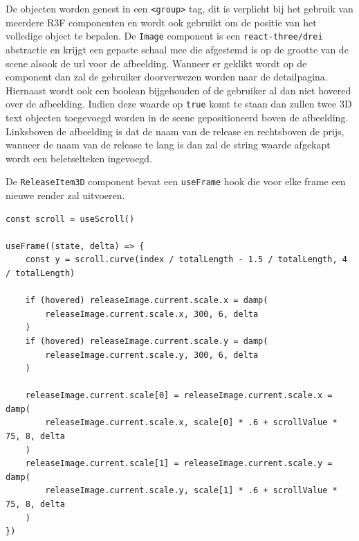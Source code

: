 De objecten worden genest in een \texttt{<group>} tag, dit is verplicht bij het gebruik van meerdere R3F componenten en wordt ook gebruikt om de positie van het volledige object te bepalen.
De \texttt{Image} component is een \texttt{react-three/drei} abstractie en krijgt een gepaste schaal mee die afgestemd is op de grootte van de scene alsook de url voor de afbeelding. Wanneer er geklikt wordt op de component dan zal de gebruiker doorverwezen worden naar de detailpagina. Hiernaast wordt ook een boolean bijgehouden of de gebruiker al dan niet hovered over de afbeelding. Indien deze waarde op \texttt{true} komt te staan dan zullen twee 3D text objecten toegevoegd worden in de scene gepositioneerd boven de afbeelding. Linksboven de afbeelding is dat de naam van de release en rechtsboven de prijs, wanneer de naam van de release te lang is dan zal de string waarde afgekapt wordt een beletselteken ingevoegd.

De \texttt{ReleaseItem3D} component bevat een \texttt{useFrame} hook die voor elke frame een nieuwe render zal uitvoeren. 
\newline

\begin{lstlisting}
const scroll = useScroll()

useFrame((state, delta) => {
	const y = scroll.curve(index / totalLength - 1.5 / totalLength, 4 / totalLength)
	
	if (hovered) releaseImage.current.scale.x = damp(
		releaseImage.current.scale.x, 300, 6, delta
	)
	if (hovered) releaseImage.current.scale.y = damp(
		releaseImage.current.scale.y, 300, 6, delta
	)
	
	releaseImage.current.scale[0] = releaseImage.current.scale.x = damp(
		releaseImage.current.scale.x, scale[0] * .6 + scrollValue * 75, 8, delta
	)
	releaseImage.current.scale[1] = releaseImage.current.scale.y = damp(
		releaseImage.current.scale.y, scale[1] * .6 + scrollValue * 75, 8, delta
	)
})
\end{lstlisting}

